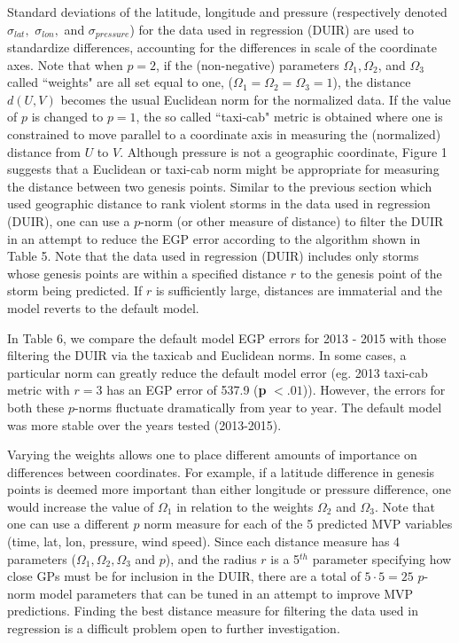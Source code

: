 \documentclass[a4paper, 12pt]{article}
\begin{document}
{{\flushleft Standard} deviations of the latitude, longitude and pressure (respectively denoted $\sigma_{lat},$ $\sigma_{lon},$ and  $\sigma_{pressure}$) for the data used in regression  (DUIR)  are used to standardize differences, accounting for the differences in scale of the coordinate axes.  Note that when $p=2$, if the (non-negative) parameters $\Omega_1, \Omega_2$, and $\Omega_3$ called ``weights" are all set equal to one, ($\Omega_1=\Omega_2=\Omega_3=1$), the distance $d(U,V)$ becomes the usual Euclidean norm for the normalized data. If the value of $p$ is changed to $p=1$, the so called ``taxi-cab" metric is obtained where one is constrained to move parallel to a coordinate axis in measuring the (normalized) distance from $U$ to $V$.  Although pressure is not a geographic coordinate, Figure 1 suggests that a Euclidean or taxi-cab norm might be appropriate for measuring the distance between two genesis points.    Similar to the previous section which used geographic distance to rank violent storms in the data used in regression (DUIR),  one can use a $p$-norm (or other measure of distance) to filter the DUIR in an attempt to reduce the EGP error according to the algorithm shown in Table 5. Note that the data used in regression (DUIR) includes only storms whose genesis points are within a specified distance $r$ to the genesis point of the storm being predicted. If $r$ is sufficiently large, distances are immaterial and the model reverts to the default model.



 In Table 6, we compare the default model EGP errors for 2013 - 2015 with those filtering the DUIR via the taxicab and Euclidean norms. In some cases, a particular norm can greatly reduce the default model error (eg. 2013 taxi-cab metric with $r=3$ has an EGP error of 537.9 ({\bf p} $<.01$)). However, the errors for both these $p$-norms fluctuate dramatically from year to year. The default model was more stable over the years tested (2013-2015).




Varying the weights allows one to place different amounts of importance on differences between coordinates.  For example, if a latitude difference in genesis points is deemed more important than either longitude or pressure difference, one would increase the value of $\Omega_1$ in relation to the weights $\Omega_2$ and $\Omega_3$.   Note that one can use a different $p$ norm measure for each of the 5 predicted MVP variables (time, lat, lon, pressure, wind speed). Since each distance measure has 4 parameters ($\Omega_1,\Omega_2,\Omega_3$ and $p$), and the radius $r$ is a 5$^{th}$ parameter specifying how close GPs must be for inclusion in the DUIR, there are a total of $5 \cdot 5 = 25$ $p$-norm model parameters that can be tuned in an attempt to improve MVP predictions. Finding the best distance measure for filtering the data used in regression is a difficult problem open to further investigation.




}
\end{document}
